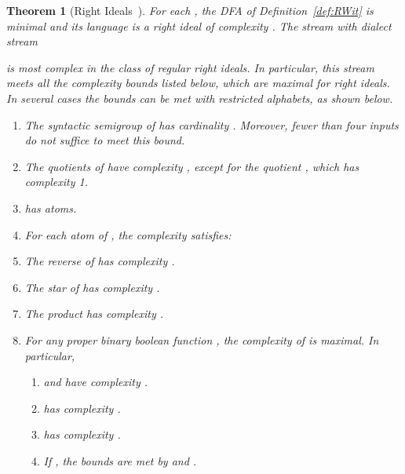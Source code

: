 \documentclass[final]{dmtcs-episciences}
\newcommand{\be}{\begin{enumerate}}
\newcommand{\ee}{\end{enumerate}}
\newtheorem{theorem}{Theorem}
\theoremstyle{definition}
\theoremstyle{remark}
\begin{document}
\begin{theorem}[Right Ideals~\cite{BrDa14}]
\label{thm:main}
For each , the DFA  of Definition~\ref{def:RWit} is minimal and its 
language  is a right ideal of complexity .
The stream   with dialect stream

is most complex in the class of regular right ideals.
In particular, this stream meets all the complexity bounds listed below, which are maximal for right ideals.
In several cases the bounds can be met with restricted alphabets, as shown below.
\begin{enumerate}
\item
The syntactic semigroup of  has cardinality .  Moreover, fewer than four inputs do not suffice to meet this bound.
\item
The quotients of  have complexity , except for the quotient , which has complexity 1.
\item
 has  atoms.
\item
For each atom  of , the complexity  satisfies:

\item
The reverse of  has complexity .
\item
The star of  has complexity .
\item
The product  has complexity .
\item
For any proper binary boolean function , the complexity of 
is maximal. In particular,
	\be
	\item
	 and  have complexity  .
	\item
	 has complexity .
	\item
	 has complexity .
	\item 
	If , the bounds are met by  and .
	\ee
\end{enumerate}
\end{theorem}
\end{document}
